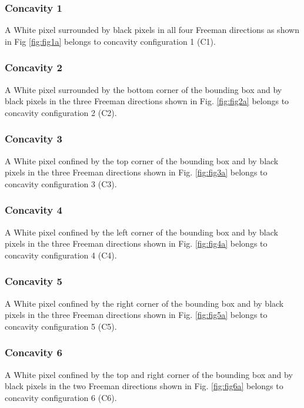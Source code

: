 \documentclass[conference]{IEEEtran}
\begin{document}
\subsubsection{Concavity 1}
A White pixel surrounded by black pixels in all four Freeman directions as shown in Fig \ref{fig:fig1a} belongs to concavity configuration 1 (C1).
\subsubsection{Concavity 2}
 A White pixel surrounded by the bottom corner of the bounding box and by black pixels in the three Freeman directions shown in Fig. \ref{fig:fig2a} belongs to concavity configuration 2 (C2).
 \subsubsection{Concavity 3}
A White pixel confined by the top corner of the bounding box and by black pixels in the three Freeman directions shown in Fig.  \ref{fig:fig3a} belongs to concavity configuration 3 (C3).

\subsubsection{Concavity 4}
 A White pixel confined by the left corner of the bounding box and by black pixels in the three Freeman directions shown in Fig.  \ref{fig:fig4a} belongs to concavity configuration 4 (C4).%
\subsubsection{Concavity 5}
 A White pixel confined by the right corner of the bounding box and by black pixels in the three Freeman directions shown in Fig.  \ref{fig:fig5a} belongs to concavity configuration 5 (C5).%

\subsubsection{Concavity 6}
 A White pixel confined by the top and right corner of the bounding box and by black pixels in the two Freeman directions shown in Fig.  \ref{fig:fig6a} belongs to concavity configuration 6 (C6).%
\end{document}
